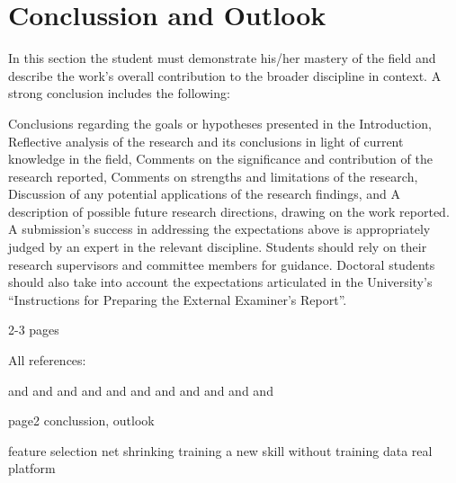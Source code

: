 \chapter{Conclussion and Outlook} \label{chap:conclussion}

In this section the student must demonstrate his/her mastery of the field and describe the work's overall contribution to the broader discipline in context. A strong conclusion includes the following:

Conclusions regarding the goals or hypotheses presented in the Introduction,
Reflective analysis of the research and its conclusions in light of current knowledge in the field,
Comments on the significance and contribution of the research reported,
Comments on strengths and limitations of the research,
Discussion of any potential applications of the research findings, and
A description of possible future research directions, drawing on the work reported.
A submission's success in addressing the expectations above is appropriately judged by an expert in the relevant discipline. Students should rely on their research supervisors and committee members for guidance. Doctoral students should also take into account the expectations articulated in the University's “Instructions for Preparing the External Examiner's Report”.

2-3 pages

All references:

\citep{article:01:visual} and \citep{article:02:laser} and \citep{article:03:motorsignals} and \citep{article:04:onlinelearning} and \citep{thesis:05:proprioception} and \citep{article:06:haptic} and \citep{thesis:07:proprioception} and \citep{article:08:rhex} and \citep{article:09:roughterrain} and \citep{article:10:pruningalgs} and \citep{book:11:scorpion} and \citep{thesis:12:gaitcontrol}

\newpage
page2 conclussion, outlook

feature selection
net shrinking
training a new skill without training data
real platform